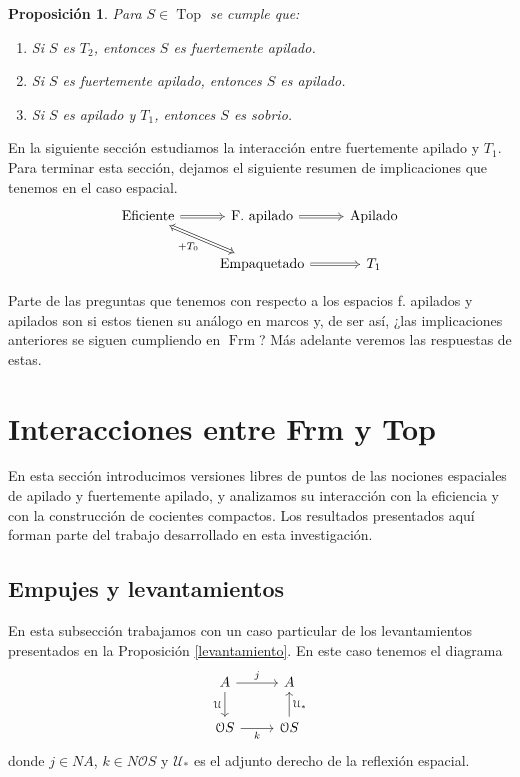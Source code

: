 \documentclass[11pt]{amsart}
\DeclareMathOperator{\Frm}{Frm}
\DeclareMathOperator{\Top}{Top}
\theoremstyle{plain}
\newtheorem{prop}[thm]{Proposición}
\theoremstyle{definition}
\begin{document}
\begin{prop}\label{Propiedadesapilado}
Para $S\in \Top$ se cumple que:
\begin{enumerate}
\item Si $S$ es $T_2$, entonces $S$ es fuertemente apilado.
\item Si $S$ es fuertemente apilado, entonces $S$ es apilado.
\item Si $S$ es apilado y $T_1$, entonces $S$ es sobrio.
\end{enumerate}
\end{prop}

En la siguiente sección estudiamos la interacción entre fuertemente apilado y $T_1$. Para terminar 
esta sección, dejamos el siguiente resumen de implicaciones que tenemos en el caso espacial.
\[\begin{tikzcd}
  {\text{Eficiente}} & {\text{F. apilado}} & {\text{Apilado}} \\
  & {\text{Empaquetado}} & {T_1}
  \arrow[Rightarrow, from=1-1, to=1-2]
  \arrow["{+ T_0}"', Leftrightarrow, from=1-1, to=2-2]
  \arrow[Rightarrow, from=1-2, to=1-3]
  \arrow[Rightarrow, from=2-2, to=2-3]
\end{tikzcd}\]

Parte de las preguntas que tenemos con respecto a los espacios f. apilados y apilados son si estos tienen su análogo en marcos y, de ser así, 
¿las implicaciones anteriores se siguen cumpliendo en $\Frm$? Más adelante veremos las respuestas de estas.

\section{Interacciones entre Frm y Top}
En esta sección introducimos versiones libres de puntos de las nociones espaciales de apilado y fuertemente apilado, y analizamos su interacción 
con la eficiencia y con la construcción de cocientes compactos. Los resultados presentados aquí forman parte del trabajo desarrollado en esta investigación.

\subsection{Empujes y levantamientos}
En esta subsección trabajamos con un caso particular de los levantamientos presentados en la Proposición \ref{levantamiento}. En este caso tenemos el diagrama
\[\begin{tikzcd}
	A & A \\
	{\mathcal{O}S} & {\mathcal{O}S}
	\arrow["j", from=1-1, to=1-2]
	\arrow["{\mathcal{U}}"', from=1-1, to=2-1]
	\arrow["k"', from=2-1, to=2-2]
	\arrow["{{\mathcal{U}}_*}"', from=2-2, to=1-2]
\end{tikzcd}\]
donde $j\in NA$, $k\in N\mathcal{O}S$ y $\mathcal{U}_*$ es el adjunto derecho de la reflexión espacial.\\
\end{document}
